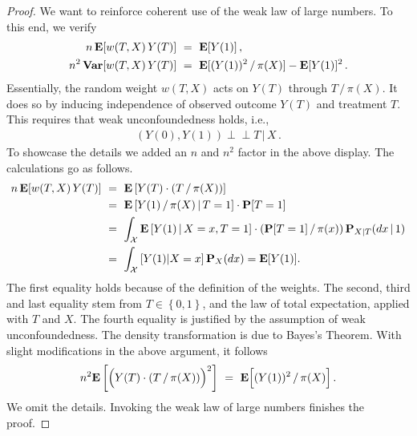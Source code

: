 \begin{proof}
We want to reinforce coherent use of the weak law of large numbers.
To this end, we verify 
\begin{align*}
  n\,\E[w(T,X)\,Y(T)]
  \ 
  &=
  \ 
  \E[Y(1)]
  \,,
  \\
  n^2\,
  \mathbf{Var}[w(T,X)\,Y(T)]
  \ 
  &=
  \ 
    \E[
    (
      Y(1)
    )^2
    \,/\,
    \pi(X)
    ]
    -
    \E[Y(1)]^2
    \,.
\end{align*}
Essentially, the random weight $w(T,X)$ acts on $Y(T)$ through $T\,/\,\pi(X)$.
It does so by inducing independence of observed outcome $Y(T)$ and treatment $T$.
This requires that weak unconfoundedness holds, i.e., 
\begin{gather}
  (Y(0),Y(1))\perp\!\!\!\perp T\, |\, X\,.
\end{gather}
To showcase the details we added an $n$ and $n^2$ factor in the above display.
The calculations go as follows.
\begin{align}
  \begin{split}
  n\,\E[w(T,X)\,Y(T)]
  &\ 
  =
  \ 
  \E
  \left[ 
    Y(T)
    \cdot
    (T\,/\,\pi(X))
  \right]
  \\
  &\ =\ 
  \E
  \left[ 
    Y(1)
    \,
    /
    \,
    \pi(X)
    \,
    \vert
    \,
    T=1
  \right]
  \cdot
  \P[T=1]
  \\
  &\ =\ 
  \int_\mathcal{X}
  \E
  \left[ 
    Y(1)
    \,
    \vert
    \,
    X=x
    ,
    T=1
  \right]
  \cdot
  (
  \P[T=1]
  \,
  /
  \,
  \pi(x)
  )
  \,
  \P_{X|T}(dx\,|\,1)
  \\
  &\ =\ 
  \int_\mathcal{X}
  \left[ 
    Y(1)
    \vert
    X=x
  \right]
  \P_X(dx)
  =
  \E[Y(1)]
  .
\end{split}
\end{align}
The first equality holds because of the definition of the weights.
The second, third and last equality stem from 
$
  T\in \left\{ 0,1 \right\}
$,
and the law of total expectation, applied with $T$ and $X$.
The fourth equality is justified by the assumption of weak unconfoundedness.
The density transformation is due to Bayes's Theorem.
With slight modifications in the above argument, it follows
\begin{gather}
  n^2
  \E
  \left[ 
  \Big( 
    Y(T)
    \cdot
    (T\,/\,\pi(X))
  \Big)
  ^2
  \right]
  \ 
    =
    \ 
    \E
    \Big[
    (Y(1))^2
    \,
    /
    \,
    \pi(X)
    \Big]
    \,.
\end{gather}
We omit the details.
Invoking the weak law of large numbers finishes the proof.
\end{proof}

